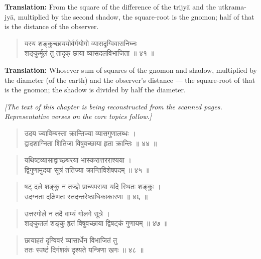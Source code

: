 \documentclass[11pt,a4paper]{article}
\newcommand{\cnote}[1]{\textcolor{notecolor}{\textit{#1}}}
\newenvironment{shloka}{\begin{verse}\devanagarifont\large}{\end{verse}}
\begin{document}
\textbf{Translation:}\quad
From the square of the difference of the trijyā and the utkrama-jyā,
multiplied by the second shadow, the square-root is the gnomon; half of
that is the distance of the observer.

\vspace{0.3cm}

\begin{shloka}
यस्य शङ्कुच्छाययोर्वर्गयोगो व्यासदृग्विवासनिघ्नः \\
शङ्कुर्मूलं तु तादृक् छाया व्यासदलविभाजिता ॥ ४१ ॥
\end{shloka}

\textbf{Translation:}\quad
Whosever sum of squares of the gnomon and shadow, multiplied by the
diameter (of the earth) and the observer's distance — the square-root of
that is the gnomon; the shadow is divided by half the diameter.

\vspace{0.3cm}
\cnote{[The text of this chapter is being reconstructed from the
scanned pages. Representative verses on the core topics follow.]}
\vspace{0.3cm}

\begin{shloka}
उदय ज्याविम्बस्ता क्रान्तिज्या व्यासगुणालब्धः ।\\
द्वादशाग्निता शितिजा विषुवच्छाया हृता क्रान्तिः ॥ ४४ ॥
\end{shloka}

\begin{shloka}
यथिष्टव्यासाद्वाच्छ्यरया भास्करात्तरराश्यया ।\\
द्विगुणामुदया सूत्रं ततिज्या क्रान्तिविशेषपदम् ॥ ४५ ॥
\end{shloka}

\begin{shloka}
षट् दले शङ्कु न तज्ज्ञे प्राच्यपराया यदि स्थितः शङ्कुः ।\\
उदग्नता दक्षिणतः स्तदन्तरेष्ठाधिकाकारणा ॥ ४६ ॥
\end{shloka}

\begin{shloka}
उत्तरगोले न तदै वाम्यं गोलगे सूत्रे ।\\
शङ्कुतलं शङ्कु हृतं विषुवच्छाया द्विषट्कं गुणायम् ॥ ४७ ॥
\end{shloka}

\begin{shloka}
छायाहतं दृग्विवरं व्यासार्धेन विभाजितं तु \\
ततः स्पष्टं दिगंशकं दृश्यते यन्त्रिणा खगः ॥ ४८ ॥
\end{shloka}
\end{document}
